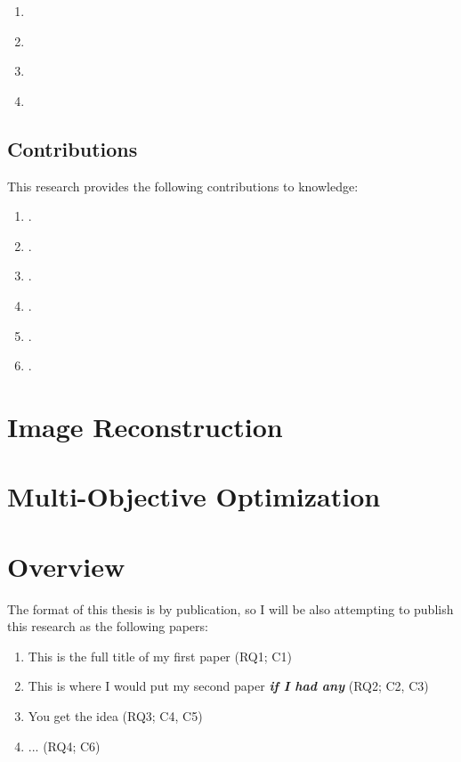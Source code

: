 \begin{enumerate}[start=1,label={RQ\arabic*:},wide = 0pt, leftmargin = 3em]
    \item \textit{\lipsum[][1]}
    \item \textit{\lipsum[][2]}
    \item \textit{\lipsum[][3]}
    \item \textit{\lipsum[][4]}
\end{enumerate}

\lipsum[5-6]

\subsection{Contributions} \label{sec:cont}

This research provides the following contributions to knowledge: 
\begin{enumerate}[start=1,label={C\arabic*:},wide = 0pt, leftmargin = 3em]
	\item \lipsum[][1]. 
	\item \lipsum[][2]. 
	\item \lipsum[][3]. 
	\item \lipsum[][4]. 
	\item \lipsum[][5]. 
	\item \lipsum[][6]. 
\end{enumerate}


\section{Image Reconstruction} \label{sec:back}

\section{Multi-Objective Optimization} \label{sec:back}

\section{Overview} \label{sec:thes}
The format of this thesis is by publication, so I will be also attempting to publish this research as the following papers:
\begin{enumerate}[start=1,label={P\arabic*:},wide = 0pt, leftmargin = 3em]
	\item This is the full title of my first paper (RQ1; C1)
	\item This is where I would put my second paper \textit{\textbf{if I had any}} (RQ2; C2, C3)
	\item You get the idea (RQ3; C4, C5)
	\item ... (RQ4; C6)
\end{enumerate}

